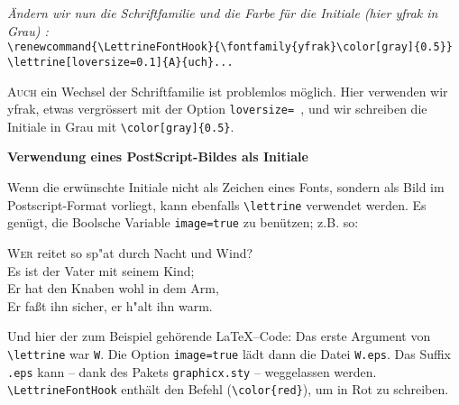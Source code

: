 \documentclass[12pt,a4paper]{article}
\begin{document}
\vspace{.5\baselineskip}
\textit{\"Andern wir nun die Schriftfamilie und die Farbe f\"ur die Initiale
(hier yfrak in Grau) :}\\
\verb+\renewcommand{\LettrineFontHook}{\fontfamily{yfrak}\color[gray]{0.5}}+\\
\verb+\lettrine[loversize=0.1]{A}{uch}...+

{%
\renewcommand{\LettrineFontHook}{\fontfamily{yfrak}\color[gray]{0.5}}

\lettrine[loversize=0.1]{A}{uch} ein Wechsel der
Schriftfamilie ist problemlos m\"oglich. Hier verwenden wir yfrak,
etwas vergr\"ossert mit der Option \verb+loversize= +, und wir schreiben
die Initiale in Grau mit \verb+\color[gray]{0.5}+.
\par}

\newpage
\begin{center}
\large\bfseries Verwendung eines PostScript-Bildes als Initiale
\end{center}

\vspace{\baselineskip} Wenn die erw\"unschte Initiale nicht als Zeichen eines
Fonts, sondern als Bild im Postscript-Format vorliegt, kann ebenfalls
\verb+\lettrine+ verwendet werden. Es gen\"ugt,
die Boolsche Variable \texttt{image=true} zu ben\"utzen; z.B. so:

\vspace{.5\baselineskip}
{%
\selectfont\Large
\renewcommand{\LettrineTextFont}{\relax}
\renewcommand{\LettrineFontHook}{\color{red}}
\lettrine[image=true, lines=3, lhang=.2, loversize=.25, %
          lraise=-.05, findent=0.1em, nindent=0em]
{W}{er} reitet so sp"at durch Nacht und Wind?\\
Es ist der Vater mit seinem Kind;\\
Er hat den Knaben wohl in dem Arm,\\
Er fa{\ss}t ihn sicher, er h"alt ihn warm.
\par}

\vspace{\baselineskip} Und hier der zum Beispiel geh\"orende \LaTeX{}--Code:
Das erste Argument von \verb+\lettrine+ war \verb+W+. Die Option \texttt{image=true}
l\"adt dann die Datei \verb+W.eps+. Das Suffix \verb+.eps+ kann -- dank des
Pakets \verb+graphicx.sty+ -- weggelassen werden. \verb+\LettrineFontHook+
enth\"alt den Befehl (\verb+\color{red}+), um in Rot zu schreiben.
\end{document}
